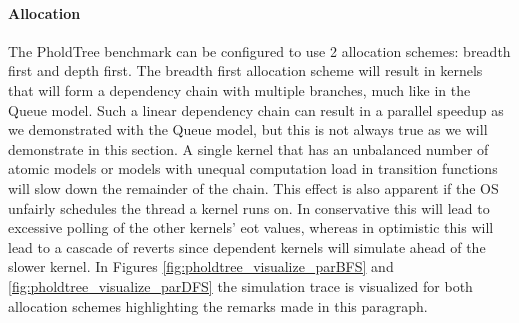 \paragraph*{Allocation}\label{PholdTreeallocation}
The PholdTree benchmark can be configured to use 2 allocation schemes: breadth first and depth first. 
The breadth first allocation scheme will result in kernels that will form a dependency chain with multiple branches, much like in the Queue model. 
Such a linear dependency chain can result in a parallel speedup as we demonstrated with the Queue model, but this is not always true as we will demonstrate in this section. 
A single kernel that has an unbalanced number of atomic models or models with unequal computation load in transition functions will slow down the remainder of the chain. This effect is also apparent if the OS unfairly schedules the thread a kernel runs on. In conservative this will lead to excessive polling of the other kernels' eot values, whereas in optimistic this will lead to a cascade of reverts since dependent kernels will simulate ahead of the slower kernel. In Figures \ref{fig:pholdtree_visualize_parBFS} and \ref{fig:pholdtree_visualize_parDFS} the simulation trace is visualized for both allocation schemes highlighting the remarks made in this paragraph.
%
%	
%	

